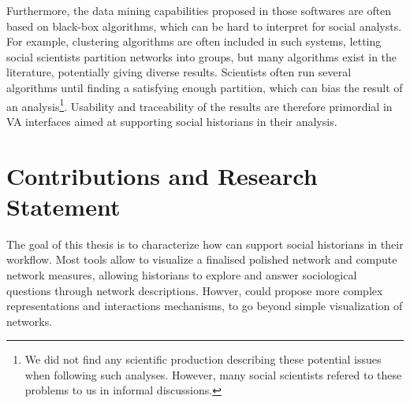 Furthermore, the data mining capabilities proposed in those softwares are often based on black-box algorithms, which can be hard to interpret for social analysts.
For example, clustering algorithms are often included in such systems, letting social scientists partition networks into groups, but many algorithms exist in the literature, potentially giving diverse results.
Scientists often run several algorithms until finding a satisfying enough partition, which can bias the result of an analysis\footnote{We did not find any scientific production describing these potential issues when following such analyses. However, many social scientists refered to these problems to us in informal discussions.}.
Usability and traceability of the results are therefore primordial in VA interfaces aimed at supporting social historians in their analysis.




\section{Contributions and Research Statement}\label{sec:contribution-and-research-statement}

The goal of this thesis is to characterize how \va can support social historians in their \hsna workflow.
Most \snv tools allow to visualize a finalised polished network and compute network measures, allowing historians to explore and answer sociological questions through network descriptions.
Howver, \va could propose more complex representations and interactions mechanisms, to go beyond simple visualization of networks.




